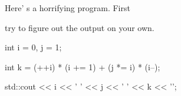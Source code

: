  Here' s a horrifying program. First

try to figure out the output on your own.

\begin{console}

int i = 0, j = 1;

int k = (++i) * (i += 1) + (j *= i) * (i--);

std::cout << i << ' ' << j << ' ' << k << '\n';

\end{console}

